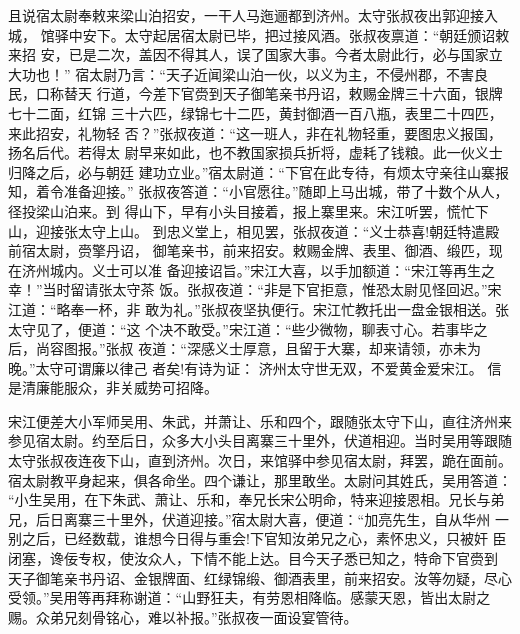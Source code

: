 且说宿太尉奉敕来梁山泊招安，一干人马迤逦都到济州。太守张叔夜出郭迎接入城，
馆驿中安下。太守起居宿太尉已毕，把过接风酒。张叔夜禀道：“朝廷颁诏敕来招
安，已是二次，盖因不得其人，误了国家大事。今者太尉此行，必与国家立大功也！”
宿太尉乃言：“天子近闻梁山泊一伙，以义为主，不侵州郡，不害良民，口称替天
行道，今差下官赍到天子御笔亲书丹诏，敕赐金牌三十六面，银牌七十二面，红锦
三十六匹，绿锦七十二匹，黄封御酒一百八瓶，表里二十四匹，来此招安，礼物轻
否？”张叔夜道：“这一班人，非在礼物轻重，要图忠义报国，扬名后代。若得太
尉早来如此，也不教国家损兵折将，虚耗了钱粮。此一伙义士归降之后，必与朝廷
建功立业。”宿太尉道：“下官在此专待，有烦太守亲往山寨报知，着令准备迎接。”
张叔夜答道：“小官愿往。”随即上马出城，带了十数个从人，径投梁山泊来。到
得山下，早有小头目接着，报上寨里来。宋江听罢，慌忙下山，迎接张太守上山。
到忠义堂上，相见罢，张叔夜道：“义士恭喜!朝廷特遣殿前宿太尉，赍擎丹诏，
御笔亲书，前来招安。敕赐金牌、表里、御酒、缎匹，现在济州城内。义士可以准
备迎接诏旨。”宋江大喜，以手加额道：“宋江等再生之幸！”当时留请张太守茶
饭。张叔夜道：“非是下官拒意，惟恐太尉见怪回迟。”宋江道：“略奉一杯，非
敢为礼。”张叔夜坚执便行。宋江忙教托出一盘金银相送。张太守见了，便道：“这
个决不敢受。”宋江道：“些少微物，聊表寸心。若事毕之后，尚容图报。”张叔
夜道：“深感义士厚意，且留于大寨，却来请领，亦未为晚。”太守可谓廉以律己
者矣!有诗为证：
济州太守世无双，不爱黄金爱宋江。
信是清廉能服众，非关威势可招降。

宋江便差大小军师吴用、朱武，并萧让、乐和四个，跟随张太守下山，直往济州来
参见宿太尉。约至后日，众多大小头目离寨三十里外，伏道相迎。当时吴用等跟随
太守张叔夜连夜下山，直到济州。次日，来馆驿中参见宿太尉，拜罢，跪在面前。
宿太尉教平身起来，俱各命坐。四个谦让，那里敢坐。太尉问其姓氏，吴用答道：
“小生吴用，在下朱武、萧让、乐和，奉兄长宋公明命，特来迎接恩相。兄长与弟
兄，后日离寨三十里外，伏道迎接。”宿太尉大喜，便道：“加亮先生，自从华州
一别之后，已经数载，谁想今日得与重会!下官知汝弟兄之心，素怀忠义，只被奸
臣闭塞，谗佞专权，使汝众人，下情不能上达。目今天子悉已知之，特命下官赍到
天子御笔亲书丹诏、金银牌面、红绿锦缎、御酒表里，前来招安。汝等勿疑，尽心
受领。”吴用等再拜称谢道：“山野狂夫，有劳恩相降临。感蒙天恩，皆出太尉之
赐。众弟兄刻骨铭心，难以补报。”张叔夜一面设宴管待。

